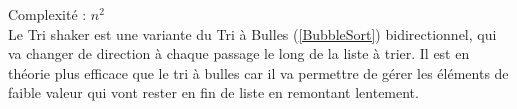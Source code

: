 \label{ShakerSort}
\footnotesize 
\noindent
Complexité :  $ n^2$
\\
\normalsize
Le Tri shaker est une variante du Tri à Bulles (\ref{BubbleSort}) bidirectionnel, qui va changer de direction à chaque passage le long de la liste à trier. Il est en théorie plus efficace que le tri à bulles car il va permettre de gérer les éléments de faible valeur qui vont rester en fin de liste en remontant lentement.